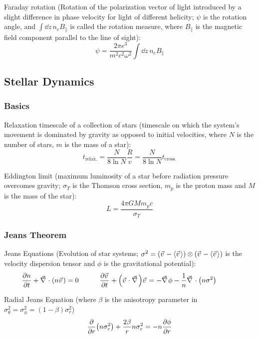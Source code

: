			\noindent
			Faraday rotation (Rotation of the polarization vector of light introduced by a slight difference in phase velocity for light of different helicity; $\psi$ is the rotation angle, and $\int \dd z\, n_e B_\parallel$ is called the rotation measure, where $B_\parallel$ is the magnetic field component parallel to the line of sight):
			\begin{equation}
				\psi = \frac{2\pi e^3}{m^2 c^2 \omega^2} \int \dd z\, n_e B_\parallel
			\end{equation}


	\subsection{Stellar Dynamics}
		\subsubsection{Basics}
			Relaxation timescale of a collection of stars (timescale on which the system's movement is dominated by gravity as opposed to initial velocities, where $N$ is the number of stars, $m$ is the mass of a star):
			\begin{equation}
				t_{\text{relax.}} = \frac{N}{8\ln N} \frac{R}{v} = \frac{N}{8\ln N} t_{\text{cross.}}
			\end{equation}

			Eddington limit (maximum luminosity of a star before radiation pressure overcomes gravity; $\sigma_T$ is the Thomson cross section, $m_p$ is the proton mass and $M$ is the mass of the star):
			\begin{equation}
				L = \frac{4 \pi G M m_p c}{\sigma_T}
			\end{equation}


		\subsubsection{Jeans Theorem}
			Jeans Equations (Evolution of star systems; $\sigma^2 = \qty(\vec{v}-\avg{\vec{v}})\otimes\qty(\vec{v}-\avg{\vec{v}})$ is the velocity dispersion tensor and $\phi$ is the gravitational potential):
			\begin{equation}
				\pdv{n}{t} + \Nabla\cdot\qty(n\vec{v}) = 0 \hsp
				\pdv{\vec{v}}{t} + \qty(\vec{v}\cdot\Nabla)\vec{v} = -\Nabla\phi -\frac{1}{n}\Nabla\cdot\qty(n\sigma^2) \hsp
			\end{equation}

			\noindent
			Radial Jeans Equation (where $\beta$ is the anisotropy parameter in $\sigma_\theta^2 = \sigma_\phi^2 = (1-\beta) \sigma_r^2$)
			\begin{equation}
				\pdv{r} \qty(n\sigma_r^2) + \frac{2\beta}{r} n\sigma_r^2 = -n\pdv{\phi}{r}
			\end{equation}
